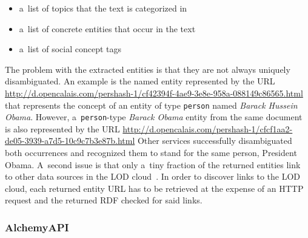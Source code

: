 \begin{itemize}
  \itemsep0em
  \item a~list of topics that the text is categorized in
  \item a~list of concrete entities that occur in the text
  \item a~list of social concept tags
\end{itemize}

The problem with the extracted entities is
that they are not always uniquely disambiguated.
An example is the named entity
represented by the URL \url{http://d.opencalais.com/pershash-1/cf42394f-4ae9-3e8e-958a-088149c86565.html}
that represents the concept of an entity of type \texttt{person}
named \emph{Barack Hussein Obama}.
However, a~\texttt{person}-type \emph{Barack Obama} entity from the same document is also represented by the URL
\url{http://d.opencalais.com/pershash-1/cfcf1aa2-de05-3939-a7d5-10c9c7b3e87b.html}
Other services successfully disambiguated both occurrences and
recognized them to stand for the same person, President Obama.
A~second issue is that only a~tiny fraction of the returned
entities link to other data sources in the
LOD cloud~\cite{bizer2011statelodcloud,cyganiak2011lodcloud}.
In order to discover links to the LOD cloud,
each returned entity URL has to be retrieved at the expense
of an HTTP request and the returned RDF checked
for said links.

\subsubsection{AlchemyAPI}

